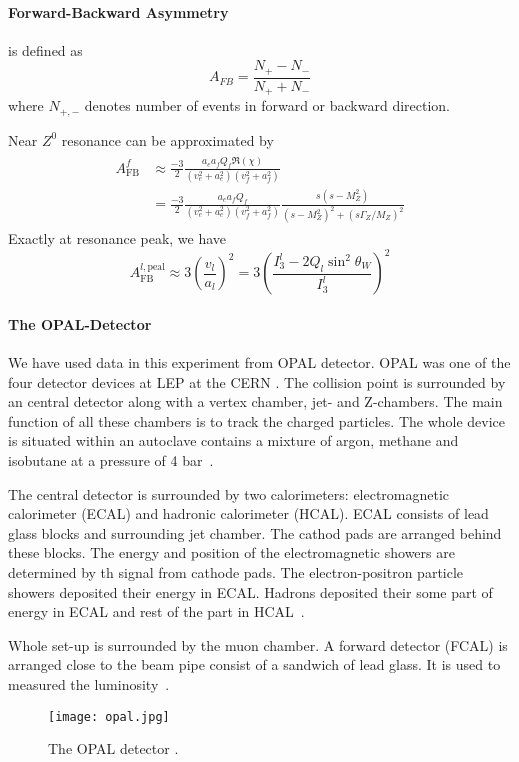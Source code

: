 \paragraph{Forward-Backward Asymmetry} is defined as 
\begin{equation}
	A_{FB} = \frac{N_+ - N_-}{N_+ + N_-}
	\label{math:AFBdef}
\end{equation}
where $N_{+,-}$ denotes number of events in forward or backward direction.

Near $Z^0$ resonance can be approximated by~\cite{manual}
\begin{align}
	\begin{split}
	A_\text{FB}^f &\approx \frac{-3}{2} \frac{a_e a_f Q_f \Re(\chi)}{(v_e^2 + a_e^2) (v_f^2 + a_f^2)} \\
	&=  \frac{-3}{2} \frac{a_e a_f Q_f }{(v_e^2 + a_e^2) (v_f^2 + a_f^2)} \frac{s(s-M_Z^2)}{(s-M_Z^2)^2 + (s \Gamma_Z / M_Z)^2 }
	\end{split}
	\label{math:AFBgen}
\end{align}
Exactly at resonance peak, we have
\begin{equation}
	A_\text{FB}^{l,\text{peal}} \approx 3 \left( \frac{v_l}{a_l} \right)^2 = 3 \left( \frac{I_3^l - 2 Q_l \sin^2\theta_W}{I_3^l} \right)^2
	\label{math:AFBpeak}
\end{equation}

\paragraph{The OPAL-Detector}
We have used data in this experiment from OPAL detector. OPAL was one of the four detector devices at LEP at the CERN \cite{manual}. The collision point is surrounded by an central detector along with  a vertex chamber, jet- and Z-chambers. The main function of all these chambers is to track the charged particles. The whole device is situated within an autoclave contains a mixture of argon, methane and isobutane at a pressure of 4 bar~\cite{manual}.

The central detector is surrounded by two calorimeters: electromagnetic calorimeter (ECAL) and hadronic calorimeter (HCAL). ECAL consists of lead glass blocks and surrounding jet chamber. The cathod pads are arranged behind these blocks. The energy and position of the electromagnetic showers are determined by th signal from cathode pads. The electron-positron particle showers deposited their energy in ECAL. Hadrons deposited their some part of energy in ECAL and rest of the part in HCAL~\cite{manual}.

Whole set-up is surrounded by the muon chamber. A forward detector (FCAL) is arranged close to the beam pipe consist of a sandwich of lead glass. It is used to measured the luminosity~\cite{manual}.


\begin{figure}[H]
	\centering
	\texttt{[image: opal.jpg]}
	\caption{ The OPAL detector \cite{manual}. }
	\label{fig:OPAL}
\end{figure}
